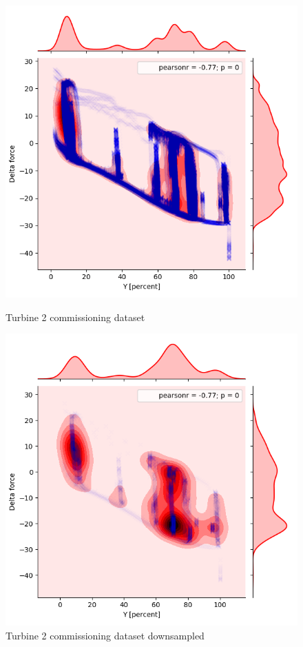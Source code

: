 \begin{figure}
    \begin{minipage}[b]{0.5\linewidth}
        \includegraphics[width=1\linewidth]{figures/data/kdePlot_noServo_A2.png} 
        \caption{Turbine 2 commissioning dataset } 
    \end{minipage}
      \hfill
      \begin{minipage}[b]{0.5\linewidth}
        \includegraphics[width=1\linewidth]{figures/data/kdePlot_reduced_noServo_A2.png} 
        \caption{Turbine 2 commissioning dataset downsampled} 
    \end{minipage} 
\end{figure}
